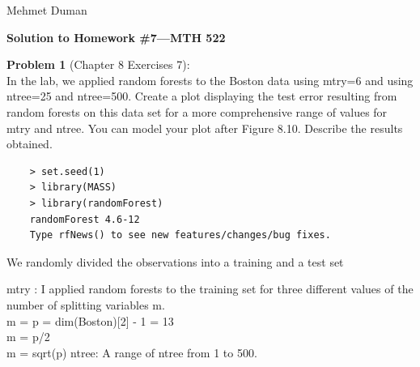 \documentclass{article}
\begin{document}
\begin{flushright}
	Mehmet Duman
\end{flushright}

\begin{center}
{\Large {\bf Solution to Homework \#7---MTH 522} }
\end{center}

{\bf Problem 1} (Chapter 8 Exercises 7):\\
In the lab, we applied random forests to the Boston data using mtry=6 and using ntree=25 and ntree=500. Create a plot displaying the test error resulting from random forests on this data set for a more comprehensive range of values for mtry and ntree. You can model your plot after Figure 8.10. Describe the results obtained.\\





\begin{program}
	\begin{verbatim}
	> set.seed(1)
	> library(MASS)
	> library(randomForest)
	randomForest 4.6-12
	Type rfNews() to see new features/changes/bug fixes.
	\end{verbatim}
\end{program}

We randomly divided the observations into a training and a test set 

mtry : I applied random forests to the training set for three different values of the number of splitting variables m.\\
m = p = dim(Boston)[2] - 1 = 13\\
m = p/2\\
m = sqrt(p)
ntree: A range of ntree from 1 to 500.
\end{document}
